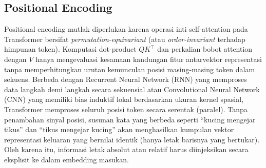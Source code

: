 \documentclass[12pt,a4paper]{article}
\begin{document}
\subsection{Positional Encoding}
Positional encoding mutlak diperlukan karena operasi inti self-attention pada Transformer bersifat \emph{permutation-equivariant} (atau \emph{order-invariant} terhadap himpunan token). Komputasi dot-product $QK^\top$ dan perkalian bobot attention dengan $V$ hanya mengevaluasi kesamaan kandungan fitur antarvektor representasi tanpa memperhitungkan urutan kemunculan posisi masing-masing token dalam sekuens. Berbeda dengan Recurrent Neural Network (RNN) yang memproses data langkah demi langkah secara sekuensial atau Convolutional Neural Network (CNN) yang memiliki bias induktif lokal berdasarkan ukuran kernel spasial, Transformer memproses seluruh posisi token secara serentak (paralel). Tanpa penambahan sinyal posisi, susunan kata yang berbeda seperti ``kucing mengejar tikus'' dan ``tikus mengejar kucing'' akan menghasilkan kumpulan vektor representasi keluaran yang bernilai identik (hanya letak barisnya yang bertukar). Oleh karena itu, informasi letak absolut atau relatif harus diinjeksikan secara eksplisit ke dalam embedding masukan.
\end{document}
